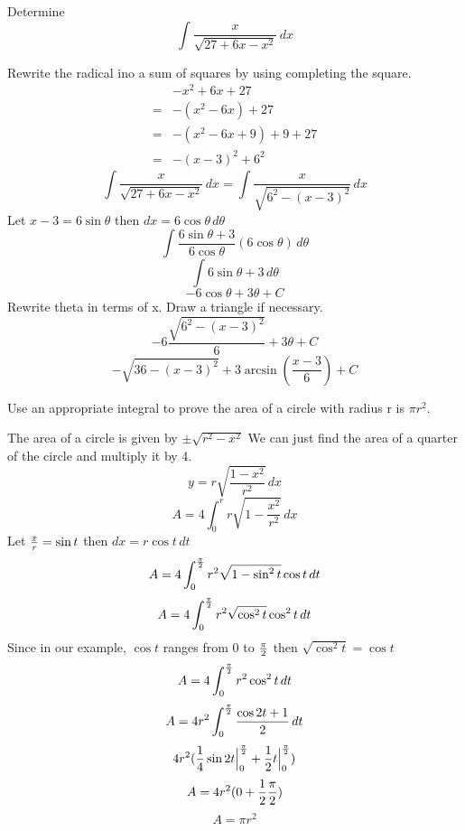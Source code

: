 \documentclass[english, 12pt]{article}
\begin{document}
\begin{exmp}
Determine
\[ \int \frac{x}{\sqrt{27 + 6x - x^2}}\,dx \]

\begin{sol}
Rewrite the radical ino a sum of squares by using completing the square.
\begin{align*}
& -x^2 + 6x + 27\\
=& - (x^2-6x) + 27\\
=& -(x^2-6x+9) +9 + 27\\
=& -(x-3)^2 + 6^2
\end{align*}
\[ \int \frac{x}{\sqrt{27 + 6x - x^2}}\,dx  = \int \frac{x}{\sqrt{6^2 - (x-3)^2}}\,dx\]
Let $x-3 = 6 \sin \theta$ then $dx = 6 \cos \theta\, d \theta$
\[\int \frac{6 \sin \theta + 3}{6 \cos \theta} (6 \cos \theta) \, d\theta \]
\[ \int 6 \sin \theta + 3 \,d\theta \]
\[ -6 \cos \theta + 3 \theta + C \]
Rewrite theta in terms of x. Draw a triangle if necessary.
\[ -6 \frac{\sqrt{6^2 - (x-3)^2}}{6} + 3 \theta + C \]
\[ - \sqrt{36 - (x-3)^2} + 3 \arcsin(\frac{x-3}{6}) + C\]
\end{sol}
\end{exmp}

\begin{exercise}
Use an appropriate integral to prove the area of a circle with radius r is $\pi r^2$.

\begin{sol}
The area of a circle is given by $\pm \sqrt{r^2-x^2}$ We can just find the area of a quarter of the circle and multiply it by 4.
\[y= r \sqrt{\frac{1-x^2}{r^2}} \,dx \]
\[A = 4 \int_0^r r \sqrt{1-\frac{x^2}{r^2}} \,dx \]
Let $\frac{x}{r} = \sin t$ then $dx = r \cos t\,dt$
\[A = 4 \int_0^{\frac{\pi}{2}} r^2 \sqrt{1-\sin^2 t} \cos t \,dt \]
\[A = 4 \int_0^{\frac{\pi}{2}} r^2 \sqrt{\cos^2 t} \cos^2 t \,dt \]
Since in our example, $\cos t$ ranges from $0$ to $\frac{\pi}{2}$ then $\sqrt{\cos^2 t} = \cos t$
\[A = 4 \int_0^{\frac{\pi}{2}} r^2 \cos^2 t \,dt \]
\[A = 4r^2 \int_0^{\frac{\pi}{2}}  \frac{\cos 2t+1}{2} \,dt \]
\[ 4r^2(\frac{1}{4} \sin 2t \Big|_0^{\frac{\pi}{2}} + \frac{1}{2} t \Big|_0^{\frac{\pi}{2}}) \]
\[ A = 4r^2 (0 + \frac{1}{2} \frac{\pi}{2}) \]
\[A = \pi r^2 \]

\end{sol}
\end{exercise}
\end{document}
